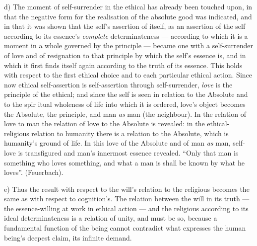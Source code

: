 \documentclass[12pt,a4paper]{book}
\begin{document}
d) The moment of self-surrender in the ethical has already been touched upon,
in that the negative form for the realisation of the absolute good was
indicated, and in that it was shown that the self's assertion of itself, as an
assertion of the self according to its essence's \emph{complete}
determinateness --- according to which it is a moment in a whole governed by
the principle --- became one with a self-surrender of love and of resignation
to that principle by which the self's essence is, and in which it first finds
itself again according to the truth of its essence. This holds with respect to
the first ethical choice and to each particular ethical action. Since now
ethical self-assertion is self-assertion through self-surrender, \emph{love}
is the principle of the ethical; and since the self is seen in relation to the
Absolute and to the spir\-%
itual wholeness of life into which it is ordered, love's object becomes the
Absolute, the principle, and man \emph{as} man (the neighbour). In the
relation of love to man the relation of love to the Absolute is revealed: in
the ethical-religious relation to humanity there is a relation to the
Absolute, which is humanity's ground of life. In this love of the Absolute and
of man \emph{as} man, self-love is transfigured and man's innermost essence
revealed. ``Only that man is something who loves something, and what a man is
shall be known by what he loves''. (Feuerbach).

e) Thus the result with respect to the will's relation to the religious
becomes the same as with respect to cognition's. The relation between the will
in its truth --- the essence-willing at work in ethical action --- and the
religious according to its ideal determinateness is a relation of unity, and
must be so, because a fundamental function of the being cannot contradict what
expresses the human being's deepest claim, its infinite demand.
\end{document}
